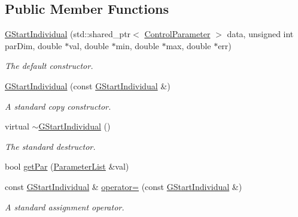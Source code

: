 \subsection*{Public Member Functions}
\begin{DoxyCompactItemize}
\item 
\hyperlink{class_gem_1_1_geneva_1_1_g_start_individual_a9e281091f2371b021c94af6c9b9ef5fa}{G\-Start\-Individual} (std\-::shared\-\_\-ptr$<$ \hyperlink{class_control_parameter}{Control\-Parameter} $>$ data, unsigned int par\-Dim, double $\ast$val, double $\ast$min, double $\ast$max, double $\ast$err)
\begin{DoxyCompactList}\small\item\em The default constructor. \end{DoxyCompactList}\item 
\hyperlink{class_gem_1_1_geneva_1_1_g_start_individual_a185646ccd2416e89a83c45de79388e60}{G\-Start\-Individual} (const \hyperlink{class_gem_1_1_geneva_1_1_g_start_individual}{G\-Start\-Individual} \&)
\begin{DoxyCompactList}\small\item\em A standard copy constructor. \end{DoxyCompactList}\item 
virtual \hyperlink{class_gem_1_1_geneva_1_1_g_start_individual_aad3e6125efd6fcb7066d1142cc2807aa}{$\sim$\-G\-Start\-Individual} ()
\begin{DoxyCompactList}\small\item\em The standard destructor. \end{DoxyCompactList}\item 
bool \hyperlink{class_gem_1_1_geneva_1_1_g_start_individual_a755a7425d632903b27d398d1432a0a16}{get\-Par} (\hyperlink{class_parameter_list}{Parameter\-List} \&val)
\item 
const \hyperlink{class_gem_1_1_geneva_1_1_g_start_individual}{G\-Start\-Individual} \& \hyperlink{class_gem_1_1_geneva_1_1_g_start_individual_a8fcd717bd9468901eb78b90ca02438ed}{operator=} (const \hyperlink{class_gem_1_1_geneva_1_1_g_start_individual}{G\-Start\-Individual} \&)
\begin{DoxyCompactList}\small\item\em A standard assignment operator. \end{DoxyCompactList}\end{DoxyCompactItemize}
